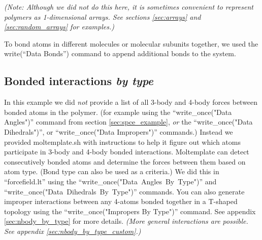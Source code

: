 \documentclass[11pt]{article}
\begin{document}
\textit{(Note: Although we did not do this here, 
it is sometimes convenient to represent polymers as 1-dimensional arrays. 
See sections \ref{sec:arrays} and \ref{sec:random_arrays} for examples.)}

To bond atoms in different molecules or molecular subunits together, we used 
the write(``Data Bonds'') command to append additional bonds to the system.



\subsection{Bonded interactions \textit{by type}}
\label{sec:nbody_by_type_intro}

In this example we did \textit{not} provide a list of all 3-body
and 4-body forces between bonded atoms in the polymer.
(for example using the ``write\_once("Data Angles")'' command
from section \ref{sec:spce_example},
\textit{or} 
the ``write\_once("Data Dihedrals")'', 
or ``write\_once("Data Impropers")'' commands.)
Instead we provided moltemplate.sh with instructions to help it figure out 
which atoms participate in 3-body and 4-body bonded interactions.
Moltemplate can detect consecutively bonded atoms and 
determine the forces between them based on atom type.
(Bond type can also be used as a criteria.)
We did this in ``forcefield.lt'' using the
\mbox{``write\_once("Data Angles By Type")''} and 
\mbox{``write\_once("Data Dihedrals By Type")''} 
commands.
You can also generate improper interactions 
between any 4-atoms bonded together in a T-shaped topology
using the  ``write\_once("Impropers By Type")'' command.
See appendix \ref{sec:nbody_by_type} for more details.
\textit{(More general interactions are possible.
 See appendix \ref{sec:nbody_by_type_custom}.)}
\end{document}
